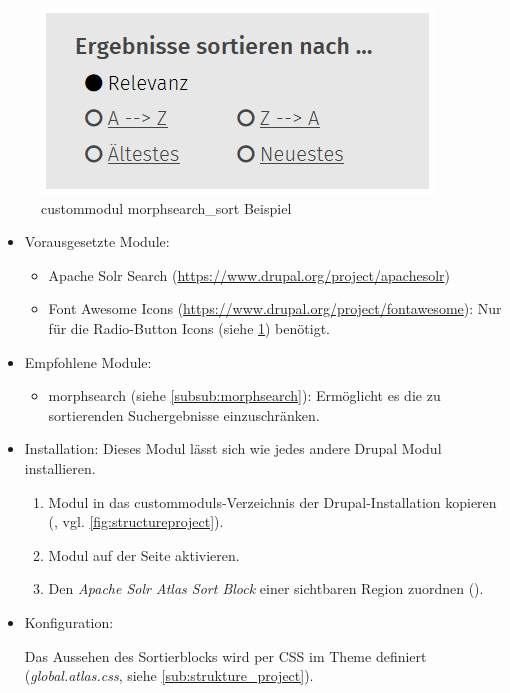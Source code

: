 \begin{figure}[H]
	\centering
	\includegraphics[height=0.10\textheight]{images/example_morphsearchsort}
	\caption{\gls{custommodul} morphsearch\_sort Beispiel}
	\label{fig:example_morphsearchsort}
\end{figure}

\begin{itemize}[parsep=0pt, itemsep=5.0pt plus 2.0pt minus 1.0pt, leftmargin=*]
	\item Vorausgesetzte Module:

	\begin{itemize}
		\item Apache Solr Search (\url{https://www.drupal.org/project/apachesolr})

		\item Font Awesome Icons (\url{https://www.drupal.org/project/fontawesome}): Nur für die Radio-Button Icons (siehe \cref{fig:example_morphsearchsort}) benötigt.
	\end{itemize}


	\item Empfohlene Module:

	\begin{itemize}
		\item morphsearch (siehe \cref{subsub:morphsearch}): Ermöglicht es die zu sortierenden Suchergebnisse einzuschränken.
	\end{itemize}


	\item Installation: Dieses Modul lässt sich wie jedes andere Drupal Modul installieren.
	\begin{enumerate}
		\item Modul in das \glspl{custommodul}-Verzeichnis der Drupal-Installation kopieren  (\zB {}, vgl. \cref{fig:structureproject}).
		\item Modul auf der Seite  aktivieren.
		\item Den \textit{Apache Solr Atlas Sort Block} einer sichtbaren Region zuordnen ().
	\end{enumerate}

	\item Konfiguration:

	\noconfig

	Das Aussehen des Sortierblocks wird per CSS im Theme definiert (\zB \textit{global.atlas.css}, siehe \cref{sub:strukture_project}).

\end{itemize}


